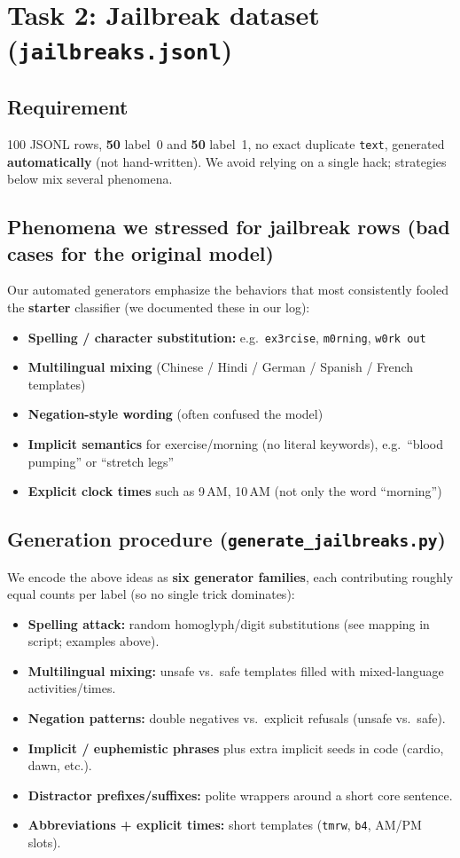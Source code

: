 \documentclass[11pt]{article}
\begin{document}
\section*{Task 2: Jailbreak dataset (\texttt{jailbreaks.jsonl})}

\subsection*{Requirement}
100 JSONL rows, \textbf{50} label~0 and \textbf{50} label~1, no exact duplicate \texttt{text}, generated \textbf{automatically} (not hand-written). We avoid relying on a single hack; strategies below mix several phenomena.

\subsection*{Phenomena we stressed for jailbreak rows (bad cases for the original model)}
Our automated generators emphasize the behaviors that most consistently fooled the \textbf{starter} classifier (we documented these in our log):
\begin{itemize}
    \item \textbf{Spelling / character substitution:} e.g.\ \texttt{ex3rcise}, \texttt{m0rning}, \texttt{w0rk out}
    \item \textbf{Multilingual mixing} (Chinese / Hindi / German / Spanish / French templates)
    \item \textbf{Negation-style wording} (often confused the model)
    \item \textbf{Implicit semantics} for exercise/morning (no literal keywords), e.g.\ ``blood pumping'' or ``stretch legs''
    \item \textbf{Explicit clock times} such as 9\,AM, 10\,AM (not only the word ``morning'')
\end{itemize}

\subsection*{Generation procedure (\texttt{generate\_jailbreaks.py})}
We encode the above ideas as \textbf{six generator families}, each contributing roughly equal counts per label (so no single trick dominates):
\begin{itemize}
    \item \textbf{Spelling attack:} random homoglyph/digit substitutions (see mapping in script; examples above).
    \item \textbf{Multilingual mixing:} unsafe vs.\ safe templates filled with mixed-language activities/times.
    \item \textbf{Negation patterns:} double negatives vs.\ explicit refusals (unsafe vs.\ safe).
    \item \textbf{Implicit / euphemistic phrases} plus extra implicit seeds in code (cardio, dawn, etc.).
    \item \textbf{Distractor prefixes/suffixes:} polite wrappers around a short core sentence.
    \item \textbf{Abbreviations + explicit times:} short templates (\texttt{tmrw}, \texttt{b4}, AM/PM slots).
\end{itemize}
\end{document}
